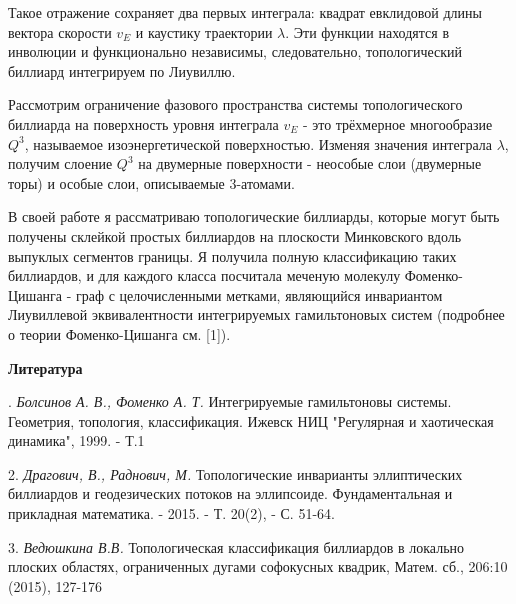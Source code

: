 Такое отражение сохраняет два первых интеграла: квадрат евклидовой длины вектора скорости $v_E$ и каустику траектории $\lambda$. Эти функции находятся в инволюции и функционально независимы, следовательно, топологический биллиард интегрируем по Лиувиллю.

Рассмотрим ограничение фазового пространства системы топологического биллиарда на поверхность уровня интеграла $v_E$ - это трёхмерное многообразие $Q^3$, называемое изоэнергетической поверхностью. Изменяя значения интеграла $\lambda$, получим слоение $Q^3$ на двумерные поверхности - неособые слои (двумерные торы) и особые слои, описываемые 3-атомами.

В своей работе я рассматриваю топологические биллиарды, которые могут быть получены склейкой простых биллиардов на плоскости Минковского вдоль выпуклых сегментов границы. Я получила полную классификацию таких биллиардов, и для каждого класса посчитала меченую молекулу Фоменко-Цишанга - граф с целочисленными метками, являющийся инвариантом Лиувиллевой эквивалентности интегрируемых гамильтоновых систем (подробнее о теории Фоменко-Цишанга см. [1]).





\smallskip \centerline {\bf Литература} . {\it Болсинов А. В., Фоменко А. Т.} Интегрируемые гамильтоновы системы. Геометрия, топология, классификация.  Ижевск НИЦ "Регулярная и хаотическая динамика", 1999. - Т.1


2. {\it Драгович, В., Раднович, М.} Топологические инварианты эллиптических биллиардов и геодезических потоков на эллипсоиде. Фундаментальная и прикладная математика. - 2015. - Т. 20(2), -  С. 51-64.

3. {\it Ведюшкина В.В.} Топологическая классификация биллиардов в локально плоских областях,
ограниченных дугами софокусных квадрик, Матем. сб., 206:10 (2015), 127-176

